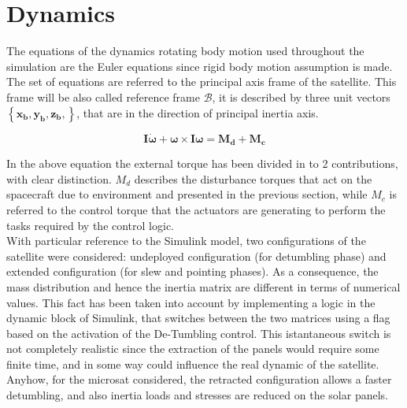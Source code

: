 \section{Dynamics}
\label{sec:dynamics}
The equations of the dynamics rotating body motion used throughout the 
simulation are the Euler equations since rigid body motion assumption is made. 
The set of equations are referred to the principal axis frame 
of the satellite. This frame will be also called reference frame $\mathcal{B}$,
it is described by three unit vectors $\left\{ \boldsymbol{x_b, y_b, z_b,} \right\}$, 
that are in the direction of principal inertia axis. 

\begin{equation}
    \boldsymbol{I\dot{\omega}} + \boldsymbol{\omega} \times \boldsymbol{I\omega} = \boldsymbol{M_d} + \boldsymbol{M_c}
\end{equation}

In the above equation the external torque has been divided in to 2 contributions, 
with clear distinction. $M_d$ describes the disturbance torques that act on the 
spacecraft due to environment and presented in the previous section, while $M_c$ 
is referred to the control torque that the actuators are generating to perform 
the tasks required by the control logic. \\
With particular reference to the Simulink model, two configurations of the satellite 
were considered: undeployed configuration (for detumbling phase) and extended configuration 
(for slew and pointing phases). As a consequence, the mass distribution and hence the inertia
matrix are different in terms of numerical values. This fact has been taken into account by implementing
a logic in the dynamic block of Simulink, that switches between the two matrices using a flag
based on the activation of the De-Tumbling control. This istantaneous switch is not completely realistic 
since the extraction of the panels would require some finite time, and in some way could influence the 
real dynamic of the satellite. Anyhow, for the microsat considered, the retracted configuration allows a 
faster detumbling, and also inertia loads and stresses are reduced on the solar panels.
